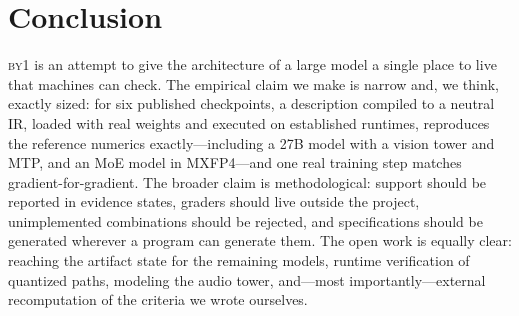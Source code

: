 \documentclass[11pt,a4paper]{article}
\newcommand{\byone}{\textsc{by1}}
\begin{document}
\section{Conclusion}

\byone{} is an attempt to give the architecture of a large model a single
place to live that machines can check. The empirical claim we make is narrow
and, we think, exactly sized: for six published checkpoints, a description
compiled to a neutral IR, loaded with real weights and executed on established
runtimes, reproduces the reference numerics exactly---including a 27B model
with a vision tower and MTP, and an MoE model in MXFP4---and one real training
step matches gradient-for-gradient. The broader claim is methodological:
support should be reported in evidence states, graders should live outside
the project, unimplemented combinations should be rejected, and
specifications should be generated wherever a program can generate them. The
open work is equally clear: reaching the artifact state for the remaining
models, runtime verification of quantized paths, modeling the audio tower,
and---most importantly---external recomputation of the criteria we wrote
ourselves.



\end{document}
